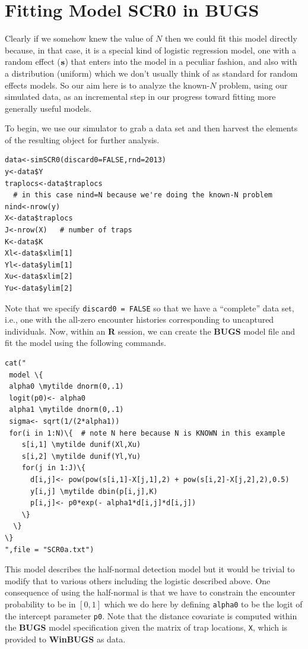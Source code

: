 \section{Fitting Model SCR0 in BUGS}
\label{scr0.sec.winbugs1}

Clearly if we somehow knew the value of $N$ then we could fit this
model directly because, in that case, it is a special kind of logistic
regression model, one with a random effect (${\bf s}$) that enters into the
model in a peculiar fashion, and also with a distribution (uniform)
which we don't usually think of as standard for random effects models.
So our aim here is to analyze the known-$N$ problem, using our
simulated data, as an incremental step in our progress toward fitting
more generally useful models.

To begin, we use our simulator to grab a data set and then harvest the
elements of the resulting object for further analysis.
\begin{verbatim}
data<-simSCR0(discard0=FALSE,rnd=2013)
y<-data$Y
traplocs<-data$traplocs
  # in this case nind=N because we're doing the known-N problem
nind<-nrow(y)
X<-data$traplocs
J<-nrow(X)   # number of traps
K<-data$K
Xl<-data$xlim[1]
Yl<-data$ylim[1]
Xu<-data$xlim[2]
Yu<-data$ylim[2]
\end{verbatim}

Note that we specify \mbox{\tt discard0 = FALSE} so that we have a
``complete'' data set, i.e., one with the all-zero encounter histories
corresponding to uncaptured individuals. Now, within an {\bf R} session, we
can create the {\bf BUGS} model file and fit the model using the following
commands.
{\small
\begin{Verbatim}[commandchars=\\\{\}]
cat("
 model \{
 alpha0 \mytilde dnorm(0,.1)
 logit(p0)<- alpha0
 alpha1 \mytilde dnorm(0,.1)
 sigma<- sqrt(1/(2*alpha1))
 for(i in 1:N)\{  # note N here because N is KNOWN in this example
    s[i,1] \mytilde dunif(Xl,Xu)
    s[i,2] \mytilde dunif(Yl,Yu)
    for(j in 1:J)\{
      d[i,j]<- pow(pow(s[i,1]-X[j,1],2) + pow(s[i,2]-X[j,2],2),0.5)
      y[i,j] \mytilde dbin(p[i,j],K)
      p[i,j]<- p0*exp(- alpha1*d[i,j]*d[i,j])
    \}
  \}
\}
",file = "SCR0a.txt")
\end{Verbatim}
}
This model describes the half-normal detection model but it
would be trivial to modify that to various others including the
logistic described above. One consequence of using the half-normal is
that we have to constrain the encounter probability to be in $[0,1]$
which we do here by defining \mbox{\tt alpha0} to be the logit of the
intercept parameter \mbox{\tt p0}. Note that the distance covariate is
computed within the {\bf BUGS} model specification given the matrix of trap
locations, \mbox{\tt X}, which is provided to {\bf WinBUGS} as data.

